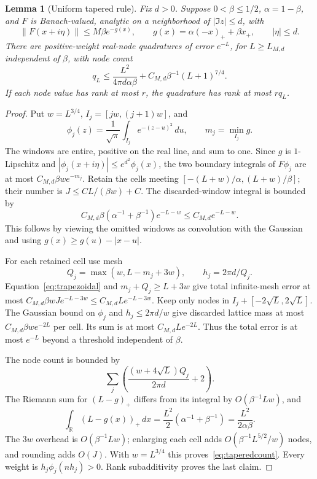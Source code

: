 \documentclass[11pt]{article}
\newtheorem{lemma}[theorem]{Lemma}
\numberwithin{equation}{section}
\newcommand{\R}{\mathbb R}
\begin{document}
\begin{lemma}[Uniform tapered rule]\label{lem:taper}
Fix $d>0$. Suppose $0<\beta\le1/2$, $\alpha=1-\beta$, and $F$ is
Banach-valued, analytic on a neighborhood of $|\Im z|\le d$, with
\begin{equation}\label{eq:smallenvelope}
 \|F(x+i\eta)\|\le M\beta e^{-g(x)},\qquad
 g(x)=\alpha(-x)_++\beta x_+,
 \qquad |\eta|\le d.
\end{equation}
There are positive-weight real-node quadratures of error $e^{-L}$,
for $L\ge L_{M,d}$ independent of $\beta$, with node count
\begin{equation}\label{eq:taperedcount}
 q_L\le\frac{L^2}{4\pi d\alpha\beta}
                   +C_{M,d}\beta^{-1}(L+1)^{7/4}.
\end{equation}
If each node value has rank at most $r$, the quadrature has rank at
most $rq_L$.
\end{lemma}
\begin{proof}
Put $w=L^{3/4}$, $I_j=[jw,(j+1)w]$, and
\[
 \phi_j(z)=\frac1{\sqrt\pi}\int_{I_j}e^{-(z-u)^2}\,du,
 \qquad m_j=\min_{I_j}g.
\]
The windows are entire, positive on the real line, and sum to one.
Since $g$ is $1$-Lipschitz and
$|\phi_j(x+i\eta)|\le e^{d^2}\phi_j(x)$, the two boundary
integrals of $F\phi_j$ are at most $C_{M,d}\beta w e^{-m_j}$.
Retain the cells meeting
$[-(L+w)/\alpha,(L+w)/\beta]$; their number is
$J\le C L/(\beta w)+C$. The discarded-window integral is bounded by
\[
 C_{M,d}\beta(\alpha^{-1}+\beta^{-1})e^{-L-w}
 \le C_{M,d}e^{-L-w}.
\]
This follows by viewing the omitted windows as convolution with the
Gaussian and using $g(x)\ge g(u)-|x-u|$.

For each retained cell use mesh
\[
 Q_j=\max(w,L-m_j+3w),\qquad h_j=2\pi d/Q_j.
\]
Equation~\eqref{eq:trapezoidal} and $m_j+Q_j\ge L+3w$ give total
infinite-mesh error at most
$C_{M,d}\beta wJ e^{-L-3w}\le C_{M,d}L e^{-L-3w}$.
Keep only nodes in $I_j+[-2\sqrt L,2\sqrt L]$.
The Gaussian bound on $\phi_j$ and $h_j\le2\pi d/w$ give discarded
lattice mass at most $C_{M,d}\beta w e^{-2L}$ per cell.
Its sum is at most $C_{M,d}L e^{-2L}$. Thus the total error is
at most $e^{-L}$ beyond a threshold independent of $\beta$.

The node count is bounded by
\[
 \sum_j\left(\frac{(w+4\sqrt L)Q_j}{2\pi d}+2\right).
\]
The Riemann sum for $(L-g)_+$ differs from its integral by
$O(\beta^{-1}Lw)$, and
\[
 \int_\R(L-g(x))_+\,dx=\frac{L^2}{2}
                     (\alpha^{-1}+\beta^{-1})=\frac{L^2}{2\alpha\beta}.
\]
The $3w$ overhead is $O(\beta^{-1}Lw)$; enlarging each cell adds
$O(\beta^{-1}L^{5/2}/w)$ nodes, and rounding adds $O(J)$.
With $w=L^{3/4}$ this proves~\eqref{eq:taperedcount}. Every weight is
$h_j\phi_j(nh_j)>0$. Rank subadditivity proves the last claim.
\end{proof}
\end{document}
